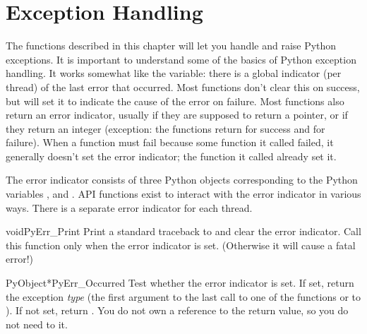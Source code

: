 \chapter{Exception Handling \label{exceptionHandling}}

The functions described in this chapter will let you handle and raise Python
exceptions.  It is important to understand some of the basics of
Python exception handling.  It works somewhat like the
\UNIX{}  variable: there is a global indicator (per
thread) of the last error that occurred.  Most functions don't clear
this on success, but will set it to indicate the cause of the error on
failure.  Most functions also return an error indicator, usually
\NULL{} if they are supposed to return a pointer, or  if they
return an integer (exception: the  functions
return  for success and  for failure).  When a
function must fail because some function it called failed, it
generally doesn't set the error indicator; the function it called
already set it.

The error indicator consists of three Python objects corresponding to
the Python variables ,  and
.  API functions exist to interact with the
error indicator in various ways.  There is a separate error indicator
for each thread.


\begin{cfuncdesc}{void}{PyErr_Print}{}
  Print a standard traceback to  and clear the error
  indicator.  Call this function only when the error indicator is
  set.  (Otherwise it will cause a fatal error!)
\end{cfuncdesc}

\begin{cfuncdesc}{PyObject*}{PyErr_Occurred}{}
  Test whether the error indicator is set.  If set, return the
  exception \emph{type} (the first argument to the last call to one of
  the  functions or to
  ).  If not set, return \NULL.  You do
  not own a reference to the return value, so you do not need to
   it.  
\end{cfuncdesc}

